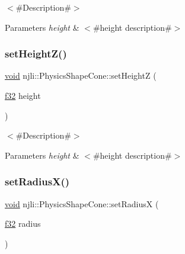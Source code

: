 $<$\#\+Description\#$>$


\begin{DoxyParams}{Parameters}
{\em height} & $<$\#height description\#$>$ \\
\hline
\end{DoxyParams}
\mbox{\label{classnjli_1_1_physics_shape_cone_a7a900e59ca5b55008a85011a14bb6f85}} 
\subsubsection{\texorpdfstring{set\+Height\+Z()}{setHeightZ()}}
{\footnotesize\ttfamily \mbox{\hyperlink{_thread_8h_af1e856da2e658414cb2456cb6f7ebc66}{void}} njli\+::\+Physics\+Shape\+Cone\+::set\+HeightZ (\begin{DoxyParamCaption}\item[{\mbox{\hyperlink{_util_8h_a5f6906312a689f27d70e9d086649d3fd}{f32}}}]{height }\end{DoxyParamCaption})}

$<$\#\+Description\#$>$


\begin{DoxyParams}{Parameters}
{\em height} & $<$\#height description\#$>$ \\
\hline
\end{DoxyParams}
\mbox{\label{classnjli_1_1_physics_shape_cone_a8a67974576e194c97ee8106135d94c65}} 
\subsubsection{\texorpdfstring{set\+Radius\+X()}{setRadiusX()}}
{\footnotesize\ttfamily \mbox{\hyperlink{_thread_8h_af1e856da2e658414cb2456cb6f7ebc66}{void}} njli\+::\+Physics\+Shape\+Cone\+::set\+RadiusX (\begin{DoxyParamCaption}\item[{\mbox{\hyperlink{_util_8h_a5f6906312a689f27d70e9d086649d3fd}{f32}}}]{radius }\end{DoxyParamCaption})}

